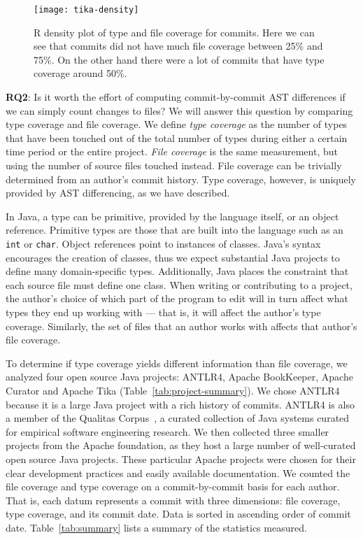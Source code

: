 \begin{figure}[ht]
\centering
\texttt{[image: tika-density]}
\caption{R density plot of type and file coverage for commits. Here we can see that commits did not have much file coverage between 25\% and 75\%. On the other hand there were a lot of commits that have type coverage around 50\%.\label{fig:tika-density}}
\end{figure}


\textbf{RQ2}: Is it worth the effort of computing commit-by-commit AST differences if we can simply count changes to files? We will answer this question by comparing type coverage and file coverage. We define \emph{type coverage} as the number of types that have been touched out of the total number of types during either a certain time period or the entire project. \emph{File coverage} is the same measurement, but using the number of source files touched instead. File coverage can be trivially determined from an author's commit history. Type coverage, however, is uniquely provided by AST differencing, as we have described.

In Java, a type can be primitive, provided by the language itself, or an object reference. Primitive types are those that are built into the language such as an \texttt{int} or \texttt{char}. Object references point to instances of classes. Java's syntax encourages the creation of classes, thus we expect substantial Java projects to define many domain-specific types. Additionally, Java places the constraint that each source file must define one class. When writing or contributing to a project, the author's choice of which part of the program to edit will in turn affect what types they end up working with --- that is, it will affect the author's type coverage. Similarly, the set of files that an author works with affects that author's file coverage.


To determine if type coverage yields different information than file coverage, we analyzed four open source Java projects: ANTLR4, Apache BookKeeper, Apache Curator and Apache Tika (Table~\ref{tab:project-summary}). We chose ANTLR4 because it is a large Java project with a rich history of commits. ANTLR4 is also a member of the Qualitas Corpus~\cite{qualitas}, a curated collection of Java systems curated for empirical software engineering research. We then collected three smaller projects from the Apache foundation, as they host a large number of well-curated open source Java projects. These particular Apache projects were chosen for their clear development practices and easily available documentation. We counted the file coverage and type coverage on a commit-by-commit basis for each author. That is, each datum represents a commit with three dimensions: file coverage, type coverage, and its commit date. Data is sorted in ascending order of commit date. Table~\ref{tab:summary} lists a summary of the statistics measured.

